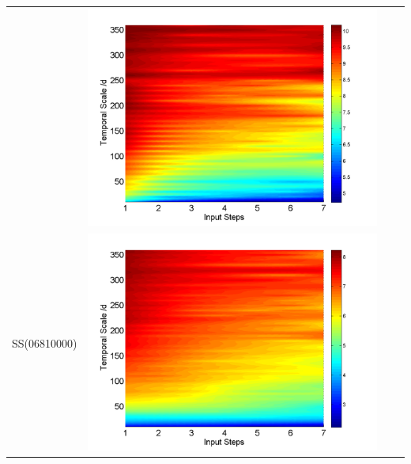 \documentclass[review]{elsarticle}
\begin{document}
\begin{table}[H]
\begin{tabular}{cccc}
&\begin{minipage}{.3\textwidth}\includegraphics[width=\linewidth]{resultgraph/11532500pepq_abs.png}\end{minipage}
\\
SS(06810000)
&\begin{minipage}{.3\textwidth}\includegraphics[width=\linewidth]{resultgraph/06810000p_abs.png}\end{minipage}

\end{tabular}
\end{table}
\end{document}
